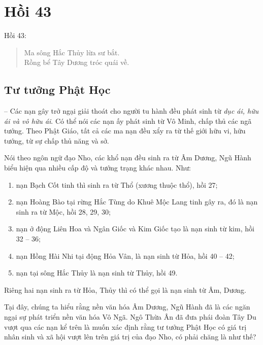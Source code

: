 \chapter{Hồi 43} %
\label{cha:hoi_43}

Hồi 43:

\begin{verse}
\begin{itshape}
Ma sông Hắc Thủy lừa sư bắt.\\
Rồng bể Tây Dương tróc quái về.
\end{itshape}
\end{verse}

\section{Tư tưởng Phật Học} %
\label{sec:43_phat_hoc}

-- Các nạn gây trở ngại giải thoát cho người tu hành đều phát sinh từ \emph{dục ái, hữu ái và vô hữu ái}. Có thể nói các nạn ấy phát sinh từ Vô Minh, chấp thủ các ngã tướng. Theo Phật Giáo, tất cả các ma nạn đều xẩy ra từ thế giới hữu vi, hữu tướng, từ sự chấp thủ năng và sở.

Nói theo ngôn ngữ đạo Nho, các khổ nạn đều sinh ra từ Âm Dương, Ngũ Hành biểu hiện qua nhiều cấp độ và tướng trạng khác nhau. Như:

\begin{enumerate}[label=\itshape\arabic*\upshape/]
    \item nạn Bạch Cốt tinh thì sinh ra từ Thổ (xương thuộc thổ), hồi 27;

    \item nạn Hoàng Bào tại rừng Hắc Tùng do Khuê Mộc Lang tinh gây ra, đó là nạn sinh ra từ Mộc, hồi 28, 29, 30;

    \item nạn ở động Liên Hoa và Ngân Giốc và Kim Giốc tạo là nạn sinh từ kim, hồi 32 -- 36;

    \item nạn Hồng Hài Nhi tại động Hỏa Vân, là nạn sinh từ Hỏa, hồi 40 -- 42;

    \item nạn tại sông Hắc Thủy là nạn sinh từ Thủy, hồi 49.
\end{enumerate}

Riêng hai nạn sinh ra từ Hỏa, Thủy thì có thể gọi là nạn sinh từ Âm, Dương.

Tại đây, chúng ta hiểu rằng nền văn hóa Âm Dương, Ngũ Hành đã là các ngăn ngại sự phát triển nền văn hóa Vô Ngã. Ngô Thừa Ân đã đưa phái đoàn Tây Du vượt qua các nạn kể trên là muốn xác định rằng tư tưởng Phật Học có giá trị nhân sinh và xã hội vượt lên trên giá trị của đạo Nho, có phải chăng là như thế?


